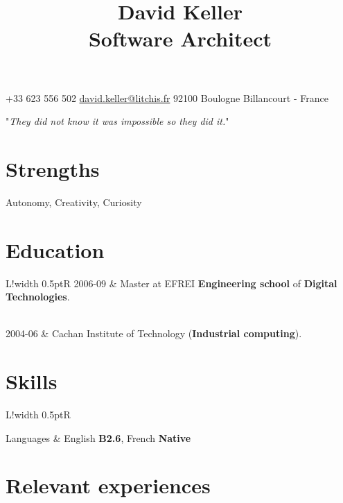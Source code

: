 \documentclass[10pt]{article}
\newcommand{\VRule}{\color{lightgray}\vrule width 0.5pt}
\begin{document}
\title{\bfseries{\Huge David Keller} \\ Software Architect}
\date{}
\author{}

\maketitle

\begin{center}
\faPhone \hspace{1pt} +33 623 556 502
\hspace{5pt} 
\faAt \hspace{1pt} \href{mailto:david.keller@litchis.fr}{david.keller@litchis.fr}
\hspace{5pt} 
\faMapMarker \hspace{1pt} 92100 Boulogne Billancourt - France
\end{center}

\begin{center}
"\textit{They did not know it was impossible so they did it.}"
\end{center}

\section*{Strengths}
Autonomy, Creativity, Curiosity

\section*{Education}
\begin{longtable}{L!{\VRule}R}
2006-09
& Master at EFREI \textbf{Engineering school} of \textbf{Digital Technologies}.

\\
2004-06
& Cachan Institute of Technology (\textbf{Industrial computing}).
\end{longtable}

\section*{Skills}
\begin{longtable}{L!{\VRule}R}

Languages
& English \textbf{B2.6}, French \textbf{Native}
\end{longtable}

\clearpage

\section*{Relevant experiences}
\end{document}
